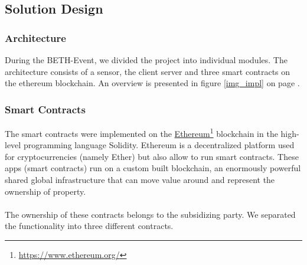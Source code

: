 \documentclass[11pt]{article}
\begin{document}
\subsection{Solution Design}
\subsubsection{Architecture}
During the BETH-Event, we divided the project into individual modules. The architecture consists of a sensor, the client server and three smart contracts on the ethereum blockchain. An overview is presented in figure \ref{img_impl} on page \pageref{img_impl}.


\subsubsection{Smart Contracts}
The smart contracts were implemented on the \hyperref[https://www.ethereum.org/]{Ethereum}\footnote{\href{https://www.ethereum.org/}{https://www.ethereum.org/}} blockchain in the high-level programming language Solidity. Ethereum is a decentralized platform used for cryptocurrencies (namely Ether) but also allow to run smart contracts. These apps (smart contracts) run on a custom built blockchain, an enormously powerful shared global infrastructure that can move value around and represent the ownership of property.\cite{23}\\\\
The ownership of these contracts belongs to the subsidizing party.
We separated the functionality into three different contracts.
\end{document}

